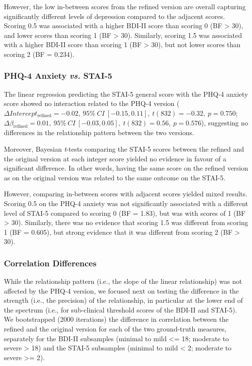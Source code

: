 \documentclass[
  man,
  floatsintext,
  longtable,
  nolmodern,
  notxfonts,
  notimes,
  colorlinks=true,linkcolor=blue,citecolor=blue,urlcolor=blue]{apa7}
\begin{document}
However, the low in-between scores from the refined version are overall
capturing significantly different levels of depression compared to the
adjacent scores. Scoring 0.5 was associated with a higher BDI-II score
than scoring 0 (BF \textgreater{} 30), and lower scores than scoring 1
(BF \textgreater{} 30). Similarly, scoring 1.5 was associated with a
higher BDI-II score than scoring 1 (BF \textgreater{} 30), but not lower
scores than scoring 2 (BF = 0.234).

\subsubsection{\texorpdfstring{PHQ-4 Anxiety \emph{vs.}
STAI-5}{PHQ-4 Anxiety vs. STAI-5}}\label{phq-4-anxiety-vs.-stai-5}

The linear regression predicting the STAI-5 general score with the PHQ-4
anxiety score showed no interaction related to the PHQ-4 version
(\(\Delta Intercept_{\text{refined}} =  -0.02,~95\%~CI~[-0.15, 0.11],~t(832) =  -0.32,~p = 0.750\);
\(\Delta \beta_{\text{refined}} = 0.01,~95\%~CI~[-0.03, 0.05],~t(832) = 0.56,~p = 0.576\)),
suggesting no differences in the relationship pattern between the two
versions.

Moreover, Bayesian \emph{t}-tests comparing the STAI-5 scores between
the refined and the original version at each integer score yielded no
evidence in favour of a significant difference. In other words, having
the same score on the refined version as on the original version was
related to the same outcome on the STAI-5.

However, comparing in-between scores with adjacent scores yielded mixed
results. Scoring 0.5 on the PHQ-4 anxiety was not significantly
associated with a different level of STAI-5 compared to scoring 0 (BF =
1.83), but was with scores of 1 (BF \textgreater{} 30). Similarly, there
was no evidence that scoring 1.5 was different from scoring 1 (BF =
0.605), but strong evidence that it was different from scoring 2 (BF
\textgreater{} 30).

\subsubsection{Correlation Differences}\label{correlation-differences}

While the relationship pattern (i.e., the slope of the linear
relationship) was not affected by the PHQ-4 version, we focused next on
testing the difference in the strength (i.e., the precision) of the
relationship, in particular at the lower end of the spectrum (i.e., for
sub-clinical threshold scores of the BDI-II and STAI-5). We bootstrapped
(2000 iterations) the difference in correlation between the refined and
the original version for each of the two ground-truth measures,
separately for the BDI-II subsamples (minimal to mild \textless= 18;
moderate to severe \textgreater{} 18) and the STAI-5 subsamples (minimal
to mild \textless{} 2; moderate to severe \textgreater= 2).
\end{document}
